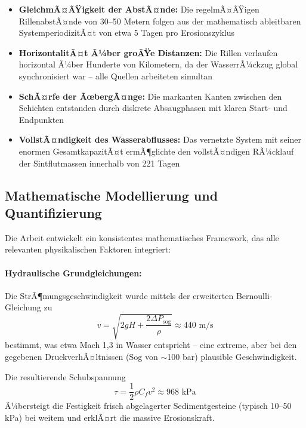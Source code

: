 ﻿\documentclass[12pt,a4paper]{report}
\begin{document}
\begin{itemize}
	\item \textbf{GleichmÃ¤ÃŸigkeit der AbstÃ¤nde:} Die regelmÃ¤ÃŸigen RillenabstÃ¤nde von 30--50 Metern folgen aus der mathematisch ableitbaren SystemperiodizitÃ¤t von etwa 5 Tagen pro Erosionszyklus
	
	\item \textbf{HorizontalitÃ¤t Ã¼ber groÃŸe Distanzen:} Die Rillen verlaufen horizontal Ã¼ber Hunderte von Kilometern, da der WasserrÃ¼ckzug global synchronisiert war -- alle Quellen arbeiteten simultan
	
	\item \textbf{SchÃ¤rfe der ÃœbergÃ¤nge:} Die markanten Kanten zwischen den Schichten entstanden durch diskrete Absaugphasen mit klaren Start- und Endpunkten
	
	\item \textbf{VollstÃ¤ndigkeit des Wasserabflusses:} Das vernetzte System mit seiner enormen GesamtkapazitÃ¤t ermÃ¶glichte den vollstÃ¤ndigen RÃ¼cklauf der Sintflutmassen innerhalb von 221 Tagen
\end{itemize}

\subsection{Mathematische Modellierung und Quantifizierung}

Die Arbeit entwickelt ein konsistentes mathematisches Framework, das alle relevanten physikalischen Faktoren integriert:

\paragraph{Hydraulische Grundgleichungen:}
Die StrÃ¶mungsgeschwindigkeit wurde mittels der erweiterten Bernoulli-Gleichung zu
\begin{equation}
	v = \sqrt{2gH + \frac{2\Delta P_{\text{sog}}}{\rho}} \approx 440 \text{ m/s}
\end{equation}
bestimmt, was etwa Mach 1,3 in Wasser entspricht -- eine extreme, aber bei den gegebenen DruckverhÃ¤ltnissen (Sog von $\sim$100 bar) plausible Geschwindigkeit.

Die resultierende Schubspannung
\begin{equation}
	\tau = \frac{1}{2}\rho C_f v^2 \approx 968 \text{ kPa}
\end{equation}
Ã¼bersteigt die Festigkeit frisch abgelagerter Sedimentgesteine (typisch 10--50 kPa) bei weitem und erklÃ¤rt die massive Erosionskraft.
\end{document}
